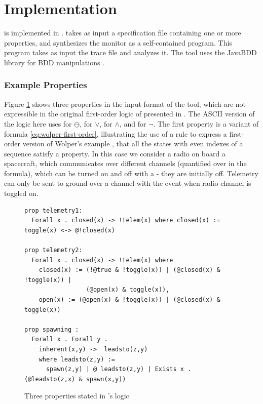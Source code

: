 
\section{Implementation}

\dejavu{} is implemented in \scalalang{}.   
\dejavu{} takes as input a specification file containing one  or 
more  properties, and synthesizes the monitor as a self-contained \scalalang{} 
program.
This program takes as input the 
trace file and analyzes it.
The tool uses the JavaBDD library for BDD manipulations \cite{javabdd}.

\subsubsection{Example Properties}

Figure \ref{fig:properties} shows three properties in the 
input format of the tool, which are not expressible in the original first-order logic of \dejavu{} presented in \cite{HPU}. 
%
The ASCII version of the logic here uses 
 for $\ominus$,
\idsl{|} for $\vee$,
\idsl{&} for $\wedge$, and
\idsl{!} for $\neg$.
%
The first property  is a variant of
formula \ref{eq:wolper-first-order}, illustrating the use of a 
rule to express a first-order version of Wolper's example \cite{Wolper}, that all the states with even indexes of a sequence satisfy a property.
In this case we consider a radio on board a spacecraft, which communicates over different channels (quantified over in the formula), which can be turned on and off with a  - they are initially off.
Telemetry can only be sent to ground over a channel  with the  event when radio channel  is toggled on.

\begin{center}
\begin{figure}
\begin{lstlisting}[language=dsl,frame=single,linewidth=0.95\textwidth,backgroundcolor=\color{white},linewidth=\columnwidth,breaklines=true,basicstyle=\small]
prop telemetry1: 
  Forall x . closed(x) -> !telem(x) where closed(x) := toggle(x) <-> @!closed(x)

prop telemetry2: 
  Forall x . closed(x) -> !telem(x) where
    closed(x) := (!@true & !toggle(x)) | (@closed(x) & !toggle(x)) | 
                 (@open(x) & toggle(x)),
    open(x) := (@open(x) & !toggle(x)) | (@closed(x) & toggle(x))

prop spawning : 
  Forall x . Forall y . 
    inherent(x,y) ->  leadsto(z,y) 
    where leadsto(z,y) := 
      spawn(z,y) | @ leadsto(z,y) | Exists x . (@leadsto(z,x) & spawn(x,y))
\end{lstlisting}
\caption{Three properties stated in \dejavu's logic}
\label{fig:properties}
\end{figure}
\end{center}

